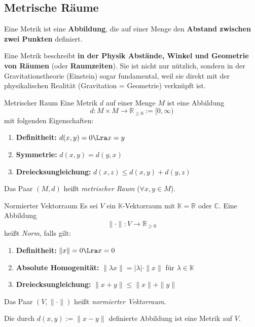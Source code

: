 \newpage
\subsection{Metrische Räume}

Eine Metrik ist eine \textbf{Abbildung}, die auf einer Menge den \textbf{Abstand zwischen zwei Punkten} definiert.

Eine Metrik beschreibt \textbf{in der Physik Abstände, Winkel und Geometrie von Räumen} (oder \textbf{Raumzeiten}). Sie ist nicht nur nützlich, sondern in der Gravitationstheorie (Einstein) sogar fundamental, weil sie direkt mit der physikalischen Realität (Gravitation = Geometrie) verknüpft ist.

\begin{definition}{Metrischer Raum}
Eine Metrik $d$ auf einer Menge $M$ ist eine Abbildung
\[
    d: M \times M \to \mathbb{R}_{\geq 0} := [0, \infty)
\]
mit folgenden Eigenschaften:
\begin{enumerate}
    \item[(M1)] \textbf{Definitheit:} $d(x, y) = 0 \Lra x = y$
    \item[(M2)] \textbf{Symmetrie:} $d(x, y) = d(y, x)$
    \item[(M3)] \textbf{Dreiecksungleichung:} $d(x, z) \leq d(x, y) + d(y, z)$
\end{enumerate}
Das Paar $(M, d)$ heißt \emph{metrischer Raum} ($\forall x,y \in M$).
\end{definition}

\vspace{1em}

\begin{definition}{Normierter Vektorraum}
Es sei $V$ ein $\mathbb{K}$-Vektorraum mit $\mathbb{K} = \mathbb{R}$ oder $\mathbb{C}$. Eine Abbildung
\[
    \| \cdot \| : V \to \mathbb{R}_{\geq 0}
\]
heißt \emph{Norm}, falls gilt:
\begin{enumerate}
    \item[(N1)] \textbf{Definitheit:} $\|x\| = 0 \Lra x = 0$
    \item[(N2)] \textbf{Absolute Homogenität:} $\|\lambda x\| = |\lambda| \cdot \|x\|$ für $\lambda \in \mathbb{K}$
    \item[(N3)] \textbf{Dreiecksungleichung:} $\|x + y\| \leq \|x\| + \|y\|$
\end{enumerate}
Das Paar $(V, \| \cdot \|)$ heißt \emph{normierter Vektorraum}.
\end{definition}

Die durch $d(x, y) := \|x - y\|$ definierte Abbildung ist eine Metrik auf $V$.

